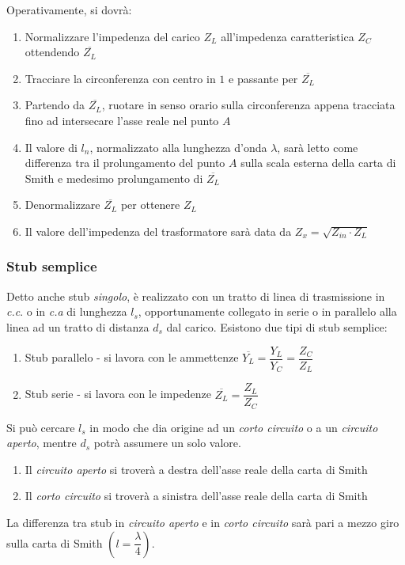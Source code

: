 \documentclass{article}
\begin{document}
Operativamente, si dovrà:
\begin{enumerate}
	\item Normalizzare l'impedenza del carico \(Z_L\) all'impedenza caratteristica \(Z_C\) ottendendo \(\overline{Z_L}\)
	\item Tracciare la circonferenza con centro in \(1\) e passante per \( \overline{Z_L} \)
	\item Partendo da \(\overline{Z_L}\), ruotare in senso orario sulla circonferenza appena tracciata fino ad intersecare l'asse reale nel punto \(A\)
	\item Il valore di \( l_n \), normalizzato alla lunghezza d'onda \( \lambda \), sarà letto come differenza tra il prolungamento del punto \(A\) sulla scala esterna della carta di Smith e medesimo prolungamento di \(\overline{Z_L}\)
	\item Denormalizzare \(\overline{Z_L}\) per ottenere \(Z_L\)
	\item Il valore dell'impedenza del trasformatore sarà data da \(Z_x = \sqrt{Z_{in} \cdot Z_L} \)
\end{enumerate}

\subsubsection{Stub semplice}
Detto anche stub \textit{singolo}, è realizzato con un tratto di linea di trasmissione in \textit{c.c}. o in \textit{c.a} di lunghezza \(l_s\), opportunamente collegato in serie o in parallelo alla linea ad un tratto di distanza \(d_s\) dal carico.
Esistono due tipi di stub semplice:
\begin{enumerate}
	\item Stub parallelo - si lavora con le ammettenze \( \overline{Y_L} = \dfrac{Y_L}{Y_C} = \dfrac{Z_C}{Z_L} \) 
	\item Stub serie - si lavora con le impedenze \( \overline{Z_L} = \dfrac{Z_L}{Z_C} \)
\end{enumerate}

Si può cercare \(l_s\) in modo che dia origine ad un \textit{corto circuito} o a un \textit{circuito aperto}, mentre \(d_s\) potrà assumere un solo valore.
\begin{enumerate}
	\item Il \textit{circuito aperto} si troverà a destra dell'asse reale della carta di Smith
	\item Il \textit{corto circuito} si troverà a sinistra dell'asse reale della carta di Smith
\end{enumerate}
La differenza tra stub in \textit{circuito aperto} e in \textit{corto circuito} sarà pari a mezzo giro sulla carta di Smith \(( l = \dfrac{\lambda}{4} )\). 
\end{document}
